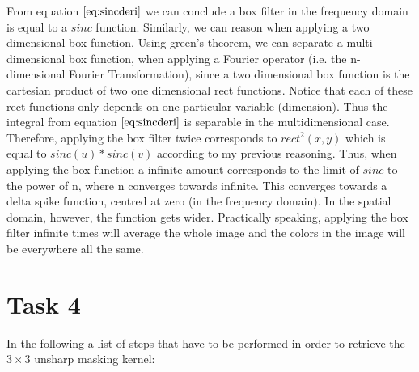 \documentclass{paper}
\begin{document}
From equation $\ref{eq:sincderi}$ we can conclude a box filter in the frequency domain is equal to a $sinc$ function. Similarly, we can reason when applying a two dimensional box function. Using green's theorem, we can separate a multi-dimensional box function, when applying a Fourier operator (i.e. the n-dimensional Fourier Transformation), since a two dimensional box function is the cartesian product of two one dimensional rect functions. Notice that each of these rect functions only depends on one particular variable (dimension). Thus the integral from equation $\ref{eq:sincderi}$ is separable in the multidimensional case. Therefore, applying the box filter twice corresponds to $rect^2(x,y)$ which is equal to $sinc(u)*sinc(v)$ according to my previous reasoning. Thus, when applying the box function a infinite amount corresponds to the limit of $sinc$ to the power of n, where n converges towards infinite. This converges towards a delta spike function, centred at zero (in the frequency domain). In the spatial domain, however, the function gets wider. Practically speaking, applying the box filter infinite times will average the whole image and  the colors in the image will be everywhere all the same.


\section*{Task 4}

In the following a list of steps that have to be performed in order to retrieve the $3 \times 3$ unsharp masking kernel:  
\end{document}
